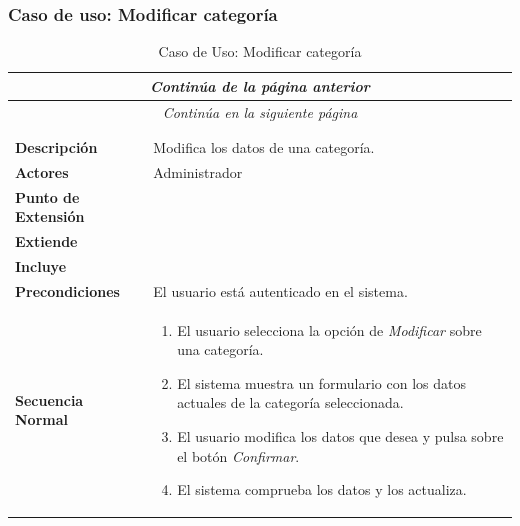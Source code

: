 \subsubsection*{Caso de uso: Modificar categoría }
\begin{longtable}{| p{4cm} | p{10cm} |}
\endfirsthead
\multicolumn{2}{c}{\textit{Continúa de la página anterior}}\\[12pt]
\hline
\endhead
\hline
\multicolumn{2}{c}{\textit{Continúa en la siguiente página}} \\
\endfoot
\hline
\caption{Caso de Uso: Modificar categoría}\label{fig:1}\\
\endlastfoot


\hline
\multicolumn{2}{|c|}{\textbf{CU$<$44$>$ - Modificar Categoría}} \\

\hline
\textbf{Descripción} &
Modifica los datos de una categoría.\\

\hline
\textbf{Actores} &
Administrador\\

\hline
\textbf{Punto de Extensión} &
\\

\hline
\textbf{Extiende} &
\\

\hline
\textbf{Incluye} &
\\

\hline
\textbf{Precondiciones} &
El usuario está autenticado en el sistema.\\

\hline
\textbf{Secuencia Normal} &\mbox{}\par\vspace{-\baselineskip}
\begin{enumerate}[leftmargin=0.7cm, topsep=0.1cm]
\item El usuario selecciona la opción de \textit{Modificar} sobre una categoría.
\item El sistema muestra un formulario con los datos actuales de la categoría seleccionada.
\item El usuario modifica los datos que desea y pulsa sobre el botón \textit{Confirmar}.
\item El sistema comprueba los datos y los actualiza.
\end{enumerate}



\end{longtable}
